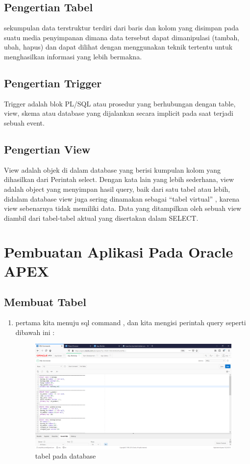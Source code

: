 \documentclass[12pt, a4paper]{report}
\begin{document}
\section{Pengertian Tabel}
sekumpulan data terstruktur terdiri dari baris dan kolom yang disimpan pada suatu media penyimpanan dimana data tersebut dapat dimanipulasi (tambah, ubah, hapus) dan dapat dilihat dengan menggunakan teknik tertentu untuk menghasilkan informasi yang lebih bermakna.

\section{Pengertian Trigger}
Trigger adalah blok PL/SQL atau prosedur yang berhubungan dengan table, view, skema atau database yang dijalankan secara implicit pada saat terjadi sebuah event. 

\section{Pengertian View}
View adalah objek di dalam database yang berisi kumpulan kolom yang dihasilkan dari Perintah select. Dengan kata lain yang lebih sederhana, view adalah object yang menyimpan hasil query, baik dari satu tabel atau lebih, didalam database view juga sering dinamakan sebagai “tabel virtual” , karena view sebenarnya tidak memiliki data. Data yang ditampilkan oleh sebuah view diambil dari tabel-tabel aktual yang disertakan dalam SELECT. 

\newpage

\chapter{Pembuatan Aplikasi Pada Oracle APEX}

\section{Membuat Tabel}
\begin{enumerate}
	\item pertama kita menuju sql command , dan kita mengisi perintah query seperti dibawah ini :
	\begin{figure}[h]
		\centering
			\includegraphics[scale=0.3]{figures/TB1.PNG}
		\caption{tabel pada database}
	\end{figure}
\end{enumerate}
\end{document}
